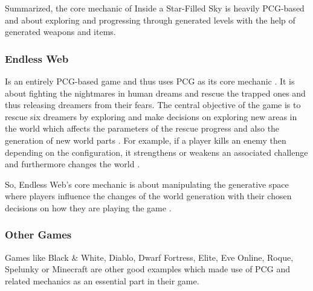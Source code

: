 \documentclass[MGS,Master,english]{twbook}%
\begin{document}
Summarized, the core mechanic of Inside a Star-Filled Sky is heavily PCG-based and about exploring and progressing through generated levels with the help of generated weapons and items.

\subsubsection{Endless Web}
Is an entirely PCG-based game and thus uses PCG as its core mechanic \cite{pcg::endlessWeb}. It is about fighting the nightmares in human dreams and rescue the trapped ones and thus releasing dreamers from their fears. The central objective of the game is to rescue six dreamers by exploring and make decisions on exploring new areas in the world which affects the parameters of the rescue progress and also the generation of new world parts \cite{pcg::endlessWeb}. For example, if a player kills an enemy then depending on the configuration, it strengthens or weakens an associated challenge and furthermore changes the world \cite{pcg::endlessWeb}.

So, Endless Web's core mechanic is about manipulating the generative space where players influence the changes of the world generation with their chosen decisions on how they are playing the game \cite{pcg::endlessWeb}.

\subsubsection{Other Games}
Games like Black \& White, Diablo, Dwarf Fortress, Elite, Eve Online, Roque, Spelunky or Minecraft are other good examples which made use of PCG and related mechanics as an essential part in their game.
\end{document}
